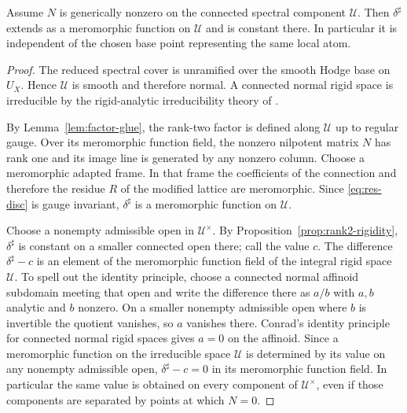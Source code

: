 \begin{lemma}
\label{lem:crossing}
%
%
%
Assume $N$ is generically nonzero on the connected spectral component
$\mathcal U$.  Then $\delta^\sharp$ extends as a meromorphic function on
$\mathcal U$ and is constant there.  In particular it is independent of the
chosen base point representing the same local atom.
\end{lemma}

\begin{proof}
The reduced spectral cover is unramified over the smooth Hodge base on
$U_X$.  Hence $\mathcal U$ is smooth and therefore normal.  A connected
normal rigid space is irreducible by the rigid-analytic irreducibility theory
of \cite{Conrad}.

By Lemma~\ref{lem:factor-glue}, the rank-two factor is defined along
$\mathcal U$ up to regular gauge.  Over its meromorphic function field, the
nonzero nilpotent matrix $N$ has rank one and its image line is generated by
any nonzero column.  Choose a meromorphic adapted frame.  In that frame the
coefficients of the connection and therefore the residue $R$ of the modified
lattice are meromorphic.  Since \eqref{eq:res-disc} is gauge invariant,
$\delta^\sharp$ is a meromorphic function on $\mathcal U$.

Choose a nonempty admissible open in $\mathcal U^\times$.  By
Proposition~\ref{prop:rank2-rigidity}, $\delta^\sharp$ is constant on a
smaller connected open there; call the value $c$.  The difference
$\delta^\sharp-c$ is an element of the meromorphic function field of the
integral rigid space $\mathcal U$.  To spell out the identity principle,
choose a connected normal affinoid subdomain meeting that open and write the
difference there as $a/b$ with $a,b$ analytic and $b$ nonzero.  On a
smaller nonempty admissible open where $b$ is invertible the quotient
vanishes, so $a$ vanishes there.  Conrad's identity principle for connected
normal rigid spaces gives $a=0$ on the affinoid.  Since a meromorphic
function on the irreducible space $\mathcal U$ is determined by its value
on any nonempty admissible open, $\delta^\sharp-c=0$ in its meromorphic
function field.  In particular the same value is obtained on every
component of $\mathcal U^\times$, even if those components are separated
by points at which $N=0$.
%
\end{proof}

